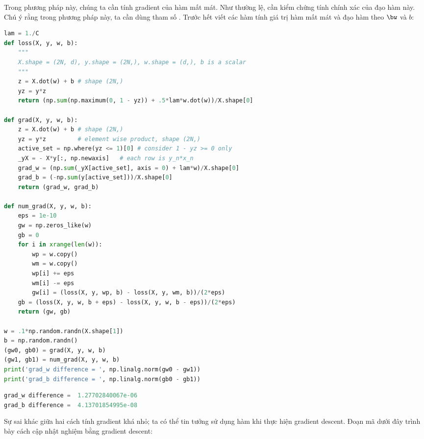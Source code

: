 Trong phương pháp này, chúng ta cần tính gradient của hàm mất mát. Như thường lệ, cần kiểm chứng tính chính xác của đạo hàm này. 
 Chú ý rằng trong phương pháp này, ta cần dùng tham số .
Trước hết viết các hàm tính giá trị hàm mất mát và đạo hàm theo $\bw$ và $b$:
\newpage
\begin{lstlisting}[language=Python]
lam = 1./C 
def loss(X, y, w, b): 
    """
    X.shape = (2N, d), y.shape = (2N,), w.shape = (d,), b is a scalar 
    """
    z = X.dot(w) + b # shape (2N,)
    yz = y*z
    return (np.sum(np.maximum(0, 1 - yz)) + .5*lam*w.dot(w))/X.shape[0]

def grad(X, y, w, b):
    z = X.dot(w) + b # shape (2N,)
    yz = y*z         # element wise product, shape (2N,)
    active_set = np.where(yz <= 1)[0] # consider 1 - yz >= 0 only 
    _yX = - X*y[:, np.newaxis]   # each row is y_n*x_n 
    grad_w = (np.sum(_yX[active_set], axis = 0) + lam*w)/X.shape[0]
    grad_b = (-np.sum(y[active_set]))/X.shape[0]
    return (grad_w, grad_b)   

def num_grad(X, y, w, b):
    eps = 1e-10
    gw = np.zeros_like(w)
    gb = 0
    for i in xrange(len(w)):
        wp = w.copy()
        wm = w.copy()
        wp[i] += eps 
        wm[i] -= eps 
        gw[i] = (loss(X, y, wp, b) - loss(X, y, wm, b))/(2*eps)
    gb = (loss(X, y, w, b + eps) - loss(X, y, w, b - eps))/(2*eps)
    return (gw, gb) 

w = .1*np.random.randn(X.shape[1])
b = np.random.randn()
(gw0, gb0) = grad(X, y, w, b)
(gw1, gb1) = num_grad(X, y, w, b)
print('grad_w difference = ', np.linalg.norm(gw0 - gw1))
print('grad_b difference = ', np.linalg.norm(gb0 - gb1))
\end{lstlisting}
\kq
\begin{lstlisting}[language=Python]
grad_w difference =  1.27702840067e-06
grad_b difference =  4.13701854995e-08
\end{lstlisting}
Sự sai khác giữa hai cách tính gradient khá nhỏ; ta có thể tin tưởng sử dụng hàm
 khi thực hiện gradient descent. 
\newpage
Đoạn mã dưới đây trình bày cách cập nhật nghiệm bằng gradient descent:
